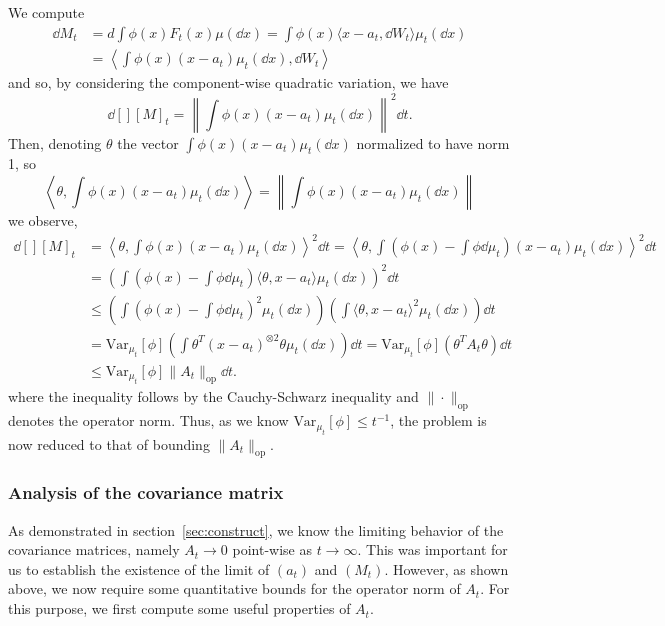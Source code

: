 We compute
\begin{align*}
  \dd M_t & = d \int \phi(x) F_t(x) \mu(\dd x) = \int \phi(x) \langle x - a_t, \dd W_t \rangle \mu_t(\dd x)\\
  & = \left\langle \int \phi(x)(x - a_t)\mu_t(\dd x), \dd W_t\right\rangle
\end{align*}
and so, by considering the component-wise quadratic variation, we have
\begin{equation}\label{eq:diff_qvar}
  \dd[] [M]_t = \left\| \int \phi(x)(x - a_t)\mu_t(\dd x) \right\|^2 \dd t.
\end{equation}
Then, denoting \(\theta\) the vector \(\int \phi(x)(x - a_t)\mu_t(\dd x)\) normalized to have norm 1, so 
\[\left\langle \theta, \int \phi(x)(x - a_t)\mu_t(\dd x)\right\rangle = \left\|\int \phi(x)(x - a_t)\mu_t(\dd x)\right\|\]
we observe,
\begin{equation}\label{eq:red_a}
  \begin{split}
    \dd[] [M]_t & = \left\langle \theta, \int \phi(x)(x - a_t)\mu_t(\dd x)\right\rangle^2 \dd t
      = \left\langle \theta, \int \left(\phi(x) - \int \phi \dd \mu_t\right)(x - a_t)\mu_t(\dd x)\right\rangle^2 \dd t\\
    & = \left(\int \left(\phi(x) - \int \phi \dd \mu_t\right) \langle \theta, x - a_t\rangle \mu_t(\dd x)\right)^2 \dd t\\
    & \le \left(\int \left(\phi(x) - \int \phi \dd \mu_t\right)^2 \mu_t(\dd x)\right) \left(\int \langle \theta, x - a_t\rangle^2 \mu_t(\dd x)\right) \dd t\\
    & = \text{Var}_{\mu_t}[\phi] \left(\int \theta^T (x - a_t)^{\otimes 2} \theta \mu_t(\dd x)\right) \dd t
      = \text{Var}_{\mu_t}[\phi] (\theta^T A_t \theta)\dd t\\ 
    & \le \text{Var}_{\mu_t}[\phi] \|A_t\|_{\text{op}} \dd t.
  \end{split}
\end{equation}
where the inequality follows by the Cauchy-Schwarz inequality and \(\|\cdot\|_{\text{op}}\) denotes the operator norm. 
Thus, as we know \(\text{Var}_{\mu_t}[\phi] \le t^{-1}\), the problem is now reduced to that of
bounding \(\|A_t\|_{\text{op}}\).

\subsubsection{Analysis of the covariance matrix}

As demonstrated in section~\ref{sec:construct}, we know the limiting behavior of the covariance matrices, namely 
\(A_t \to 0\) point-wise as \(t \to \infty\). This was important for us to establish the existence of the limit 
of \((a_t)\) and \((M_t)\). However, as shown above, we now require some quantitative bounds for the operator 
norm of \(A_t\). For this purpose, we first compute some useful properties of \(A_t\).


